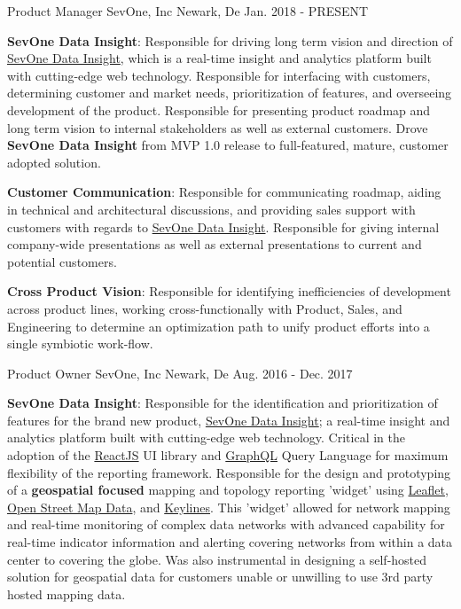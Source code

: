 \begin{cventries}
  \cventry
    {Product Manager}
    {SevOne, Inc}
    {Newark, De}
    {Jan. 2018 - PRESENT}
    {
      \begin{cvitems}
        \item{\textbf{SevOne Data Insight}: Responsible for driving long term vision and direction of \href{https://www.sevone.com/sevone-data-insight}{SevOne Data Insight}, which is a real-time insight and analytics platform built with cutting-edge web technology.  Responsible for interfacing with customers, determining customer and market needs, prioritization of features, and overseeing development of the product.  Responsible for presenting product roadmap and long term vision to internal stakeholders as well as external customers.  Drove \textbf{SevOne Data Insight} from MVP 1.0 release to full-featured, mature, customer adopted solution.}
        \item{\textbf{Customer Communication}: Responsible for communicating roadmap, aiding in technical and architectural discussions, and providing sales support with customers with regards to \href{https://www.sevone.com/sevone-data-insight}{SevOne Data Insight}.  Responsible for giving internal company-wide presentations as well as external presentations to current and potential customers.}
        \item{\textbf{Cross Product Vision}: Responsible for identifying inefficiencies of development across product lines, working cross-functionally with Product, Sales, and Engineering to determine an optimization path to unify product efforts into a single symbiotic work-flow.}
      \end{cvitems}
    }

  \cventry
    {Product Owner}
    {SevOne, Inc}
    {Newark, De}
    {Aug. 2016 - Dec. 2017}
    {
      \begin{cvitems}
        \item{\textbf{SevOne Data Insight}: Responsible for the identification and prioritization of features for the brand new product, \href{https://www.sevone.com/sevone-data-insight}{SevOne Data Insight}; a real-time insight and analytics platform built with cutting-edge web technology.  Critical in the adoption of the \href{http://reactjs.org}{ReactJS} UI library and \href{http://graphql.org}{GraphQL} Query Language for maximum flexibility of the reporting framework. Responsible for the design and prototyping of a \textbf{geospatial focused} mapping and topology reporting 'widget' using \href{http://www.leaflet.org}{Leaflet}, \href{http://www.openstreetmap.org}{Open Street Map Data}, and \href{http://www.keylines.com}{Keylines}.  This 'widget' allowed for network mapping and real-time monitoring of complex data networks with advanced capability for real-time indicator information and alerting covering networks from within a data center to covering the globe. Was also instrumental in designing a self-hosted solution for geospatial data for customers unable or unwilling to use 3rd party hosted mapping data.}
      \end{cvitems}
    }


\end{cventries}
